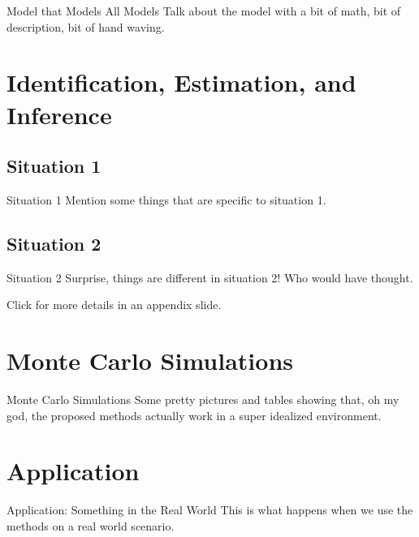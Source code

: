 \documentclass[]{beamer}
\theoremstyle{plain}
\newif\ifSectionTitlePage
\newcommand\NextSectionWithoutTitlePage{\SectionTitlePagefalse}
\begin{document}
\begin{frame}{Model that Models All Models}
	Talk about the model with a bit of math, bit of description, bit of hand waving.
\end{frame}

\NextSectionWithoutTitlePage %
\section{Identification, Estimation, and Inference}

\subsection{Situation 1}

\begin{frame}{Situation 1}
	Mention some things that are specific to situation 1.
\end{frame}

\subsection{Situation 2}

\begin{frame}[label=situation2]{Situation 2}
	Surprise, things are different in situation 2! Who would have thought.
	
	Click \hyperlink{extra_details}{} for more details in an appendix slide.
\end{frame}

\section{Monte Carlo Simulations}

\begin{frame}{Monte Carlo Simulations}
	Some pretty pictures and tables showing that, oh my god, the proposed methods actually work in a super idealized environment.
\end{frame}

\section{Application}

\begin{frame}{Application: Something in the Real World}
	This is what happens when we use the methods on a real world scenario.
\end{frame}
\end{document}
